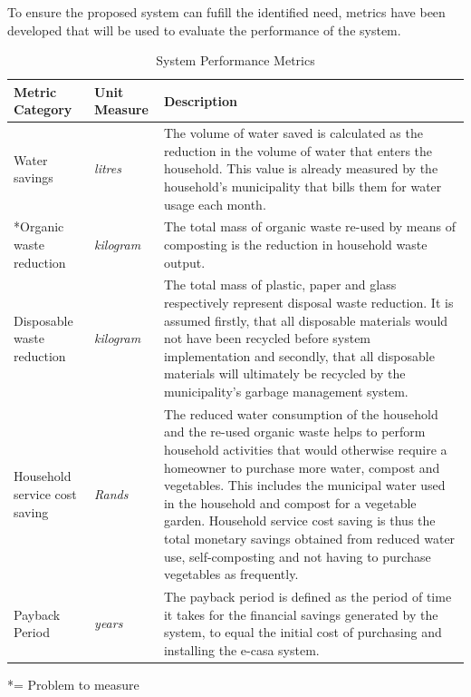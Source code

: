 \documentclass[a4paper,11pt,fleqn]{report}
\begin{document}
To ensure the proposed system can fufill the identified need, metrics have been developed that will be used to evaluate the performance of the system.
%
\begin{table}[h!]
\caption {System Performance Metrics} \label{tb: Performance_Metrics} 
\begin{center}
\begin{tabular}{p{5cm}|p{3cm}|p{8cm}}\toprule
	{\textbf{Metric Category}} & {\textbf{Unit Measure}} & {\textbf{Description}}\\ \midrule
    Water savings & \textit{litres} & The volume of water saved is calculated as the reduction in the volume of water that enters the household. This value is already measured by the household's municipality that bills them for water usage each month.\\
    \hline
    *Organic waste reduction & \textit{kilogram} & The total mass of organic waste re-used by means of composting is the reduction in household waste output.\\
    \hline
    Disposable waste reduction & \textit{kilogram} & The total mass of plastic, paper and glass respectively represent disposal waste reduction. It is assumed firstly, that all disposable materials would not have been recycled before system implementation and secondly, that all disposable materials will ultimately be recycled by the municipality's garbage management system.\\
    \hline
    Household service cost saving & \textit{Rands} & The reduced water consumption of the household and the re-used organic waste helps to perform household activities that would otherwise require a homeowner to purchase more water, compost and vegetables. This includes the municipal water used in the household and compost for a vegetable garden. Household service cost saving is thus the total monetary savings obtained from reduced water use, self-composting and not having to purchase vegetables as frequently.\\
    \hline
    Payback Period & \textit{years} & The payback period is defined as the period of time it takes for the financial savings generated by the system, to equal the initial cost of purchasing and installing the \ac{e-casa} system. \\ \bottomrule
\end{tabular}
\end{center}
\end{table}
%
*= Problem to measure
\end{document}
